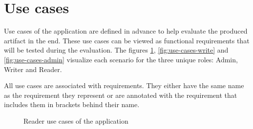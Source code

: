 \section{Use cases}

Use cases of the application are defined in advance to help evaluate 
the produced artifact in the end. 
These use cases can be viewed as functional requirements that 
will be tested during the evaluation. 
The figures \ref{fig:use-cases-reader}, \ref{fig:use-cases-write} 
and \ref{fig:use-cases-admin} visualize each scenario for the three unique roles: Admin, Writer and Reader. 


All use cases are associated with requirements. 
They either have the same name as the requirement they represent or are annotated with the requirement that includes them in brackets behind their name.

\begin{figure}[!h]
    \centering
    \caption{Reader use cases of the application}
    \label{fig:use-cases-reader}
\end{figure}



